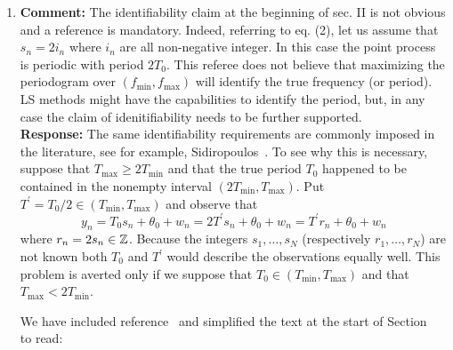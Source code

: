 \documentclass[a4paper,10pt]{article}
\begin{document}
\begin{enumerate}

\item\textbf{Comment:}
 The identifiability claim at the beginning of sec. II is not obvious and a reference is mandatory. Indeed, referring to eq. (2), let us assume that $s_n = 2 i_n$ where $i_n$ are all non-negative integer. In this case the point process is periodic with period $2 T_0$. This referee does not believe that maximizing the periodogram over $(f_{\text{min}},f_{\text{max}})$ will identify the true frequency (or period). LS methods might have the capabilities to identify the period, but, in any case the claim of idenitifiability needs to be further supported.
\\
\textbf{Response:} The same identifiability requirements are commonly imposed in the literature, see for example, Sidiropoulos~\cite[eq. (2)]{Sidiropoulos2005}.  To  see why this is necessary, suppose that $T_{\text{max}} \geq 2T_{\text{min}}$ and that the true period $T_0$ happened to be contained in the nonempty interval $(2T_{\text{min}}, T_{\text{max}})$.  Put $T^\prime = T_0/2 \in (T_{\text{min}}, T_{\text{max}})$ and observe that
\[
y_n = T_0 s_n + \theta_0 + w_n = 2 T^\prime s_n + \theta_0 + w_n = T^\prime r_n + \theta_0 + w_n 
\]
where $r_n = 2 s_n \in {\mathbb Z}$.  Because the integers $s_1,\dots,s_N$ (respectively $r_1,\dots,r_N$) are not known both $T_0$ and $T^\prime$ would describe the observations equally well.  This problem is averted only if we suppose that $T_0 \in (T_{\text{min}}, T_{\text{max}})$ and that  $T_{\text{max}} < 2T_{\text{min}}$.



We have included reference~\cite{Sidiropoulos2005} and simplified the text at the start of Section~ to read:


\end{enumerate}
\end{document}
